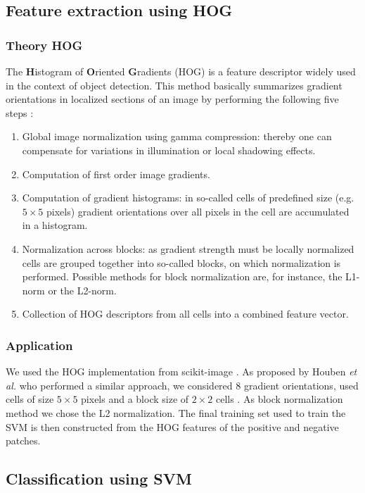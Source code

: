 \documentclass[12pt,a4paper,bibliography=totocnumbered,listof=totocnumbered]{scrartcl}
\begin{document}
\subsection{Feature extraction using HOG}

\subsubsection{Theory HOG}
The \textbf{H}istogram of \textbf{O}riented \textbf{G}radients (HOG) is a feature descriptor widely used in the context of object detection. This method basically summarizes gradient orientations in localized sections of an image by performing the following five steps \cite{Dalal}: 

\begin{enumerate}
	\item Global image normalization using gamma compression: thereby one can compensate for variations in illumination or local shadowing effects.
	\item Computation of first order image gradients.
	\item Computation of gradient histograms: in so-called cells of predefined size (e.g. $5 \times 5$ pixels) gradient orientations over all pixels in the cell are accumulated in a histogram. 
	\item Normalization across blocks: as gradient strength must be locally normalized cells are grouped together into so-called blocks, on which normalization is performed. Possible methods for block normalization are, for instance, the L1-norm or the L2-norm.
	\item Collection of HOG descriptors from all cells into a combined feature vector. 
\end{enumerate}

\subsubsection{Application}
We used the HOG implementation from scikit-image \cite{scikithog}. As proposed by Houben \textit{et al.} who performed a similar approach, we considered 8 gradient orientations, used cells of size $5 \times 5$ pixels and a block size of $2 \times 2$ cells \cite{Houben-IJCNN-2013}. As block normalization method we chose the L2 normalization.
The final training set used to train the SVM is then constructed from the HOG features of the positive and negative patches. 

\subsection{Classification using SVM}
\end{document}
